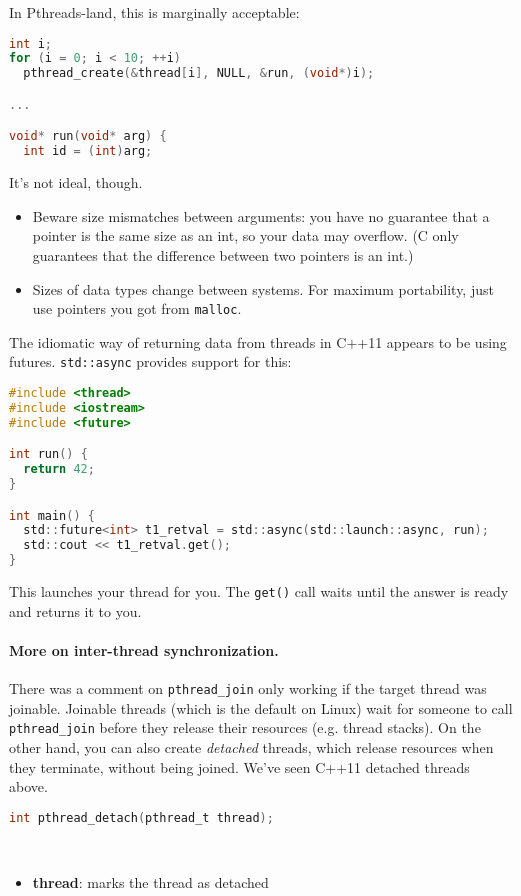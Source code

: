 In Pthreads-land, this is marginally acceptable:
\begin{lstlisting}[language=C]
int i;
for (i = 0; i < 10; ++i)
  pthread_create(&thread[i], NULL, &run, (void*)i);

...

void* run(void* arg) {
  int id = (int)arg;
\end{lstlisting}
It's not ideal, though.
  \begin{itemize}
    \item Beware size mismatches between arguments: you have
      no guarantee that a pointer is the same size as an int, so your data
      may overflow. (C only guarantees that the difference between two pointers is an int.)
    \item Sizes of data types change between systems. For maximum
      portability, just use pointers you got from {\tt malloc}.
  \end{itemize}

  The idiomatic way of returning data from threads in C++11 appears to be using
  futures. {\tt std::async} provides support for this:
\begin{lstlisting}[language=C]
#include <thread>
#include <iostream>
#include <future>

int run() {
  return 42;
}

int main() {
  std::future<int> t1_retval = std::async(std::launch::async, run);
  std::cout << t1_retval.get();
}
\end{lstlisting}
This launches your thread for you. The {\tt get()} call waits until the answer
is ready and returns it to you.

\paragraph{More on inter-thread synchronization.} There was a comment on {\tt pthread\_join}
only working if the target thread was joinable. Joinable threads
(which is the default on Linux) wait for someone to call {\tt pthread\_join}
before they release their resources (e.g. thread stacks). On the other
hand, you can also create \emph{detached} threads, which release
resources when they terminate, without being joined. We've seen C++11 detached
threads above.

\begin{lstlisting}[language=C]
int pthread_detach(pthread_t thread);
\end{lstlisting}
~\vspace*{-3em}
\begin{itemize}
\item  {\bf thread}: marks the thread as detached
\end{itemize}

